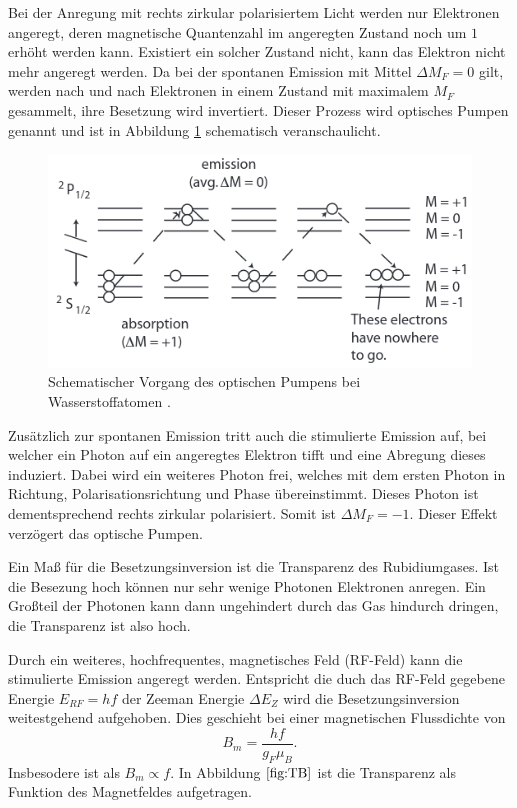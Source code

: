 \noindent
Bei der Anregung mit rechts zirkular polarisiertem Licht werden nur 
Elektronen angeregt, deren magnetische Quantenzahl im angeregten 
Zustand noch um $\num{1}$ erhöht werden kann. Existiert ein solcher
Zustand nicht, kann das Elektron nicht mehr angeregt werden. Da bei 
der spontanen Emission mit Mittel $\Delta M_F=0$ gilt, werden nach und nach 
Elektronen in einem Zustand mit maximalem $M_F$ gesammelt, ihre 
Besetzung wird invertiert. Dieser Prozess wird optisches Pumpen 
genannt und ist in Abbildung \ref{fig:pumpen} schematisch 
veranschaulicht.
\begin{figure}[H]
    \centering
    \includegraphics[scale= 0.5]{pictures/pumpen.png}
    \caption{Schematischer Vorgang des optischen Pumpens bei Wasserstoffatomen \cite{OpticalPumping}.}
    \label{fig:pumpen}
\end{figure}
\noindent
Zusätzlich zur spontanen Emission tritt auch die stimulierte Emission
auf, bei welcher ein Photon auf ein angeregtes Elektron tifft und 
eine Abregung dieses induziert. Dabei wird ein weiteres Photon 
frei, welches mit dem ersten Photon in Richtung, Polarisationsrichtung
und Phase übereinstimmt. Dieses Photon ist dementsprechend rechts zirkular
polarisiert. Somit ist $\Delta M_F=-1$. Dieser Effekt verzögert das 
optische Pumpen.


\noindent
Ein Maß für die Besetzungsinversion ist die Transparenz des 
Rubidiumgases. Ist die Besezung hoch können nur sehr wenige Photonen
Elektronen anregen. Ein Großteil der Photonen kann dann ungehindert
durch das Gas hindurch dringen, die Transparenz ist also hoch. 

\noindent
Durch ein weiteres, hochfrequentes, magnetisches Feld (RF-Feld) kann
die stimulierte Emission angeregt werden. Entspricht die duch das
RF-Feld gegebene Energie $E_{RF}=hf$ der Zeeman Energie $\Delta E_Z$
wird die Besetzungsinversion weitestgehend aufgehoben. Dies geschieht
bei einer magnetischen Flussdichte von
\begin{equation}
    B_m=\frac{hf}{g_F\mu_B} .
\end{equation}
Insbesodere ist als $B_m\propto f$. In Abbildung $\ref{fig:TB}$ ist 
die Transparenz als Funktion des Magnetfeldes aufgetragen.

